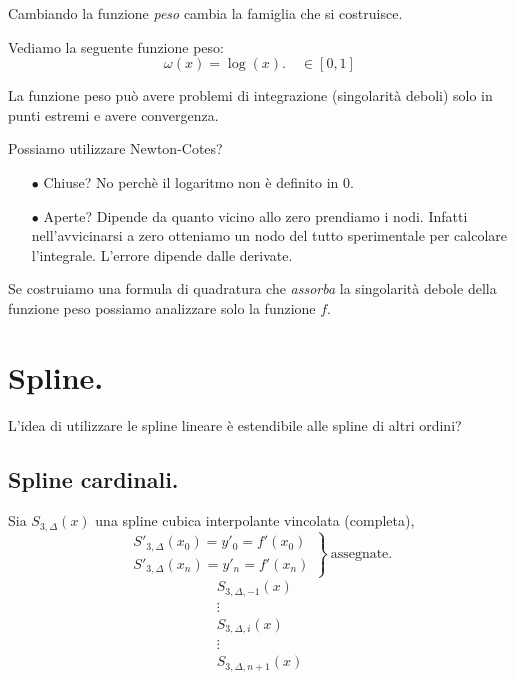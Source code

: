 \begin{osse}
Cambiando la funzione \emph{peso} cambia la famiglia che si costruisce.
\end{osse}
Vediamo la seguente funzione peso:
\[
\omega(x) = \log(x). \quad \in [0,1]
\]

\begin{osse}
La funzione peso può avere problemi di integrazione (singolarità deboli) solo
in punti estremi e avere convergenza.
\end{osse}

Possiamo utilizzare Newton-Cotes?
\begin{itemize}
\item[$\bullet$]Chiuse? No perchè il logaritmo non è definito in $0$.
\item[$\bullet$]Aperte? Dipende da quanto vicino allo zero prendiamo i nodi.
Infatti nell'avvicinarsi a zero otteniamo un nodo del tutto sperimentale per
calcolare l'integrale. L'errore dipende dalle derivate.
\end{itemize}

Se costruiamo una formula di quadratura che \emph{assorba} la singolarità
debole della funzione peso possiamo analizzare solo la funzione $f$.

\section{Spline.}
L'idea di utilizzare le spline lineare è estendibile alle spline di altri
ordini?
\subsection{Spline cardinali.}
Sia $S_{3,\Delta}(x)$ una spline cubica interpolante vincolata
(completa),
\[\left.
\begin{array}{r}
S'_{3,\Delta}(x_0) = y'_0 = f'(x_0) \\
S'_{3,\Delta}(x_n) = y'_n = f'(x_n)
\end{array}\right\} \ \textrm{assegnate.}
\]
\[
\begin{array}{c}
S_{3,\Delta,-1}(x)\\
\vdots \\
S_{3,\Delta,i}(x) \\
\vdots \\
S_{3,\Delta,n+1}(x)
\end{array}
\]

